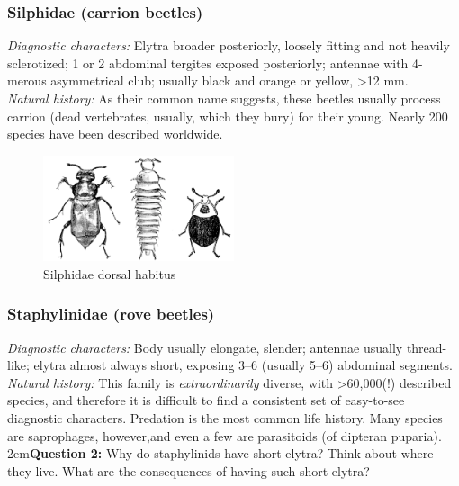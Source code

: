 \documentclass[letterpaper, 11pt]{article}
\begin{document}
\subsubsection{Silphidae (carrion beetles)}
\noindent{}\textit{Diagnostic characters:} Elytra broader posteriorly, loosely fitting and not heavily sclerotized; 1 or 2 abdominal tergites exposed posteriorly; antennae with 4-merous asymmetrical club; usually black and orange or yellow, \textgreater12 mm.\\

\noindent{}\textit{Natural history:} As their common name suggests, these beetles usually process carrion (dead vertebrates, usually, which they bury) for their young. Nearly 200 species have been described worldwide.

\begin{figure}[ht!]
  \centering
    \includegraphics[width=0.5\textwidth]{silphids.png}
  \caption{Silphidae dorsal habitus \citep[][Fig. 142]{bhlitem92397}}
  \label{fig:silphid}
\end{figure}

\subsubsection{Staphylinidae (rove beetles)}
\noindent{}\textit{Diagnostic characters:} Body usually elongate, slender; antennae usually thread-like; elytra almost always short, exposing 3--6 (usually 5--6) abdominal segments.\\

\noindent{}\textit{Natural history:} This family is \textit{extraordinarily} diverse, with \textgreater60,000(!) described species, and therefore it is difficult to find a consistent set of easy-to-see diagnostic characters. Predation is the most common life history. Many species are saprophages, however,and even a few are parasitoids (of dipteran puparia).\\

\hangindent2em\textbf{Question 2:} Why do staphylinids have short elytra? Think about where they live. What are the consequences of having such short elytra? \\
\end{document}
